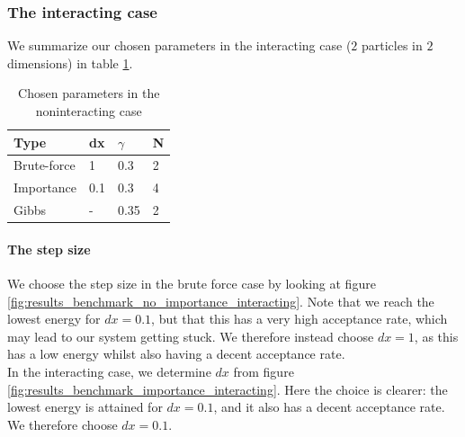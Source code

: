 \documentclass[a4paper, 10pt]{article}
\begin{document}
\subsubsection{The interacting case}\label{sec:tuning_parameters_interacting}
We summarize our chosen parameters in the interacting case ($2$ particles in $2$ dimensions) in table \ref{tab:chosen_parameters_interacting}.
\begin{table}[ht!]
	\centering
	\caption{Chosen parameters in the noninteracting case}
	\label{tab:chosen_parameters_interacting}
	\begin{tabular}{llll}
		Type        & dx  & $\gamma$ & N \\
		\hline
		Brute-force & 1 & 0.3      & 2 \\
		Importance  & 0.1 & 0.3      & 4 \\
		Gibbs       & -   & 0.35      & 2
	\end{tabular}
\end{table}
\paragraph{The step size}
We choose the step size in the brute force case by looking at figure \ref{fig:results_benchmark_no_importance_interacting}. Note that we reach the lowest energy for $dx=0.1$, but that this has a very high acceptance rate, which may lead to our system getting stuck. We therefore instead choose $dx=1$, as this has a low energy whilst also having a decent acceptance rate.\\
\linebreak
In the interacting case, we determine $dx$ from figure \ref{fig:results_benchmark_importance_interacting}. Here the choice is clearer: the lowest energy is attained for $dx=0.1$, and it also has a decent acceptance rate. We therefore choose $dx=0.1$.
\linebreak
\end{document}
